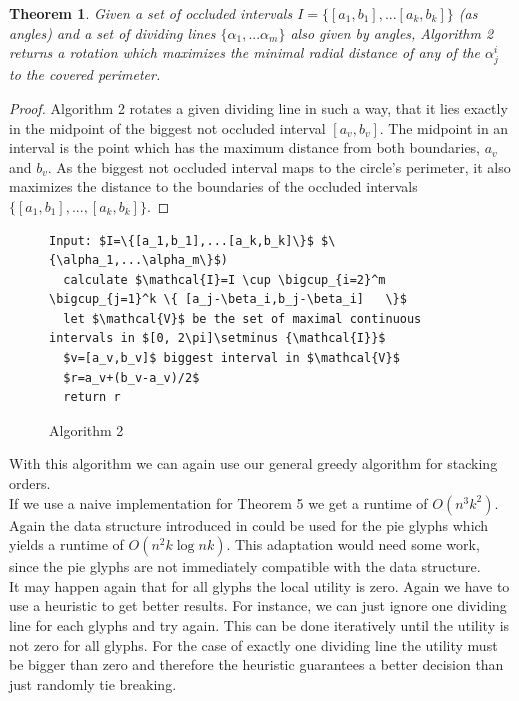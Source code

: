 \documentclass[a4paper,11pt]{article}
\newtheorem{theorem}{Theorem}
\begin{document}
\begin{theorem}
  Given a set of occluded intervals $I=\{[a_1,b_1],...[a_k,b_k]\}$ (as angles) and a set of dividing lines $\{\alpha_1,...\alpha_m\}$ also given by angles, Algorithm 2 returns a rotation which maximizes the minimal radial distance of any of the $\alpha^i_j$ to the covered perimeter.
\end{theorem}

\begin{proof}
  Algorithm 2 rotates a given dividing line in such a way, that it lies exactly in the midpoint of the biggest not occluded interval $[a_v, b_v]$. The midpoint in an interval is the point which has the maximum distance from both boundaries, $a_v$ and $b_v$. As the biggest not occluded interval maps to the circle's perimeter, it also maximizes the distance to the boundaries of the occluded intervals $\{[a_1, b_1], ..., [a_k, b_k]\}$.
\end{proof}

\begin{figure}[!bth]
  \begin{lstlisting}[mathescape=true ]
Input: $I=\{[a_1,b_1],...[a_k,b_k]\}$ $\{\alpha_1,...\alpha_m\}$)
  calculate $\mathcal{I}=I \cup \bigcup_{i=2}^m    \bigcup_{j=1}^k \{ [a_j-\beta_i,b_j-\beta_i]   \}$
  let $\mathcal{V}$ be the set of maximal continuous intervals in $[0, 2\pi]\setminus {\mathcal{I}}$
  $v=[a_v,b_v]$ biggest interval in $\mathcal{V}$
  $r=a_v+(b_v-a_v)/2$
  return r
  \end{lstlisting}
  \caption{Algorithm 2}
\end{figure}

With this algorithm we can again use our general greedy algorithm for stacking orders.\\

If we use a naive implementation for Theorem 5 we get a runtime of $O(n^3k^2)$. Again the data structure introduced in \cite{cabello} could be used for the pie glyphs which yields a runtime of $O(n^2k \log nk)$. This adaptation would need some work, since the pie glyphs are not immediately  compatible with the data structure.\\


It may happen again that for all glyphs the local utility is zero. Again we have to use a heuristic to get better results. For instance, we can just ignore one dividing line for each glyphs and try again. This can be done iteratively until the utility is not zero for all glyphs. For the case of exactly one dividing line the utility must be bigger than zero and therefore the heuristic guarantees a better decision than just randomly tie breaking.
\end{document}
